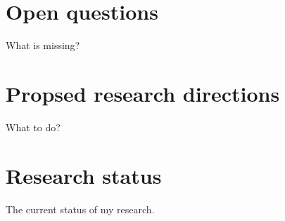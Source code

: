 \chapter{Open questions}
What is missing?

\chapter{Propsed research directions}
What to do?

\chapter{Research status}
The current status of my research.
